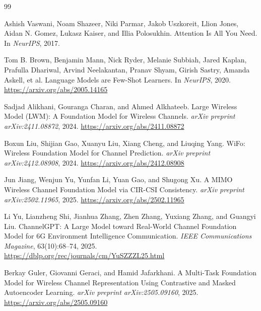 \documentclass[11pt]{article}
\begin{document}

\begin{thebibliography}{99}

Ashish Vaswani, Noam Shazeer, Niki Parmar, Jakob Uszkoreit, Llion Jones, Aidan N. Gomez, Lukasz Kaiser, and Illia Polosukhin.
\newblock Attention Is All You Need.
\newblock In \emph{NeurIPS}, 2017.

Tom B. Brown, Benjamin Mann, Nick Ryder, Melanie Subbiah, Jared Kaplan, Prafulla Dhariwal, Arvind Neelakantan, Pranav Shyam, Girish Sastry, Amanda Askell, et al.
\newblock Language Models are Few-Shot Learners.
\newblock In \emph{NeurIPS}, 2020.
\newblock \url{https://arxiv.org/abs/2005.14165}

Sadjad Alikhani, Gouranga Charan, and Ahmed Alkhateeb.
\newblock Large Wireless Model (LWM): A Foundation Model for Wireless Channels.
\newblock \emph{arXiv preprint arXiv:2411.08872}, 2024.
\newblock \url{https://arxiv.org/abs/2411.08872}

Boxun Liu, Shijian Gao, Xuanyu Liu, Xiang Cheng, and Liuqing Yang.
\newblock WiFo: Wireless Foundation Model for Channel Prediction.
\newblock \emph{arXiv preprint arXiv:2412.08908}, 2024.
\newblock \url{https://arxiv.org/abs/2412.08908}

Jun Jiang, Wenjun Yu, Yunfan Li, Yuan Gao, and Shugong Xu.
\newblock A MIMO Wireless Channel Foundation Model via CIR-CSI Consistency.
\newblock \emph{arXiv preprint arXiv:2502.11965}, 2025.
\newblock \url{https://arxiv.org/abs/2502.11965}

Li Yu, Lianzheng Shi, Jianhua Zhang, Zhen Zhang, Yuxiang Zhang, and Guangyi Liu.
\newblock ChannelGPT: A Large Model toward Real-World Channel Foundation Model for 6G Environment Intelligence Communication.
\newblock \emph{IEEE Communications Magazine}, 63(10):68--74, 2025.
\newblock \url{https://dblp.org/rec/journals/cm/YuSZZZL25.html}

Berkay Guler, Giovanni Geraci, and Hamid Jafarkhani.
\newblock A Multi-Task Foundation Model for Wireless Channel Representation Using Contrastive and Masked Autoencoder Learning.
\newblock \emph{arXiv preprint arXiv:2505.09160}, 2025.
\newblock \url{https://arxiv.org/abs/2505.09160}


\end{thebibliography}
\end{document}
